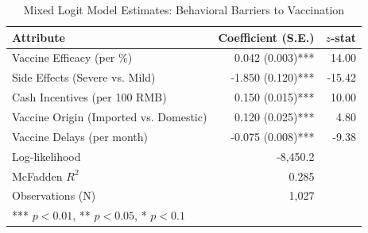 \begin{table}[ht]
\centering
\caption{Mixed Logit Model Estimates: Behavioral Barriers to Vaccination}
\label{tab:results_main}
\begin{tabular}{lrr}
\toprule
Attribute & Coefficient (S.E.) & $z$-stat \\
\midrule
Vaccine Efficacy (per \%) & 0.042 (0.003)*** & 14.00 \\
Side Effects (Severe vs. Mild) & -1.850 (0.120)*** & -15.42 \\
Cash Incentives (per 100 RMB) & 0.150 (0.015)*** & 10.00 \\
Vaccine Origin (Imported vs. Domestic) & 0.120 (0.025)*** & 4.80 \\
Vaccine Delays (per month) & -0.075 (0.008)*** & -9.38 \\
\midrule
Log-likelihood & -8,450.2 & \\
McFadden $R^2$ & 0.285 & \\
Observations (N) & 1,027 & \\
\bottomrule
\multicolumn{3}{l}{*** $p < 0.01$, ** $p < 0.05$, * $p < 0.1$}
\end{tabular}
\end{table}